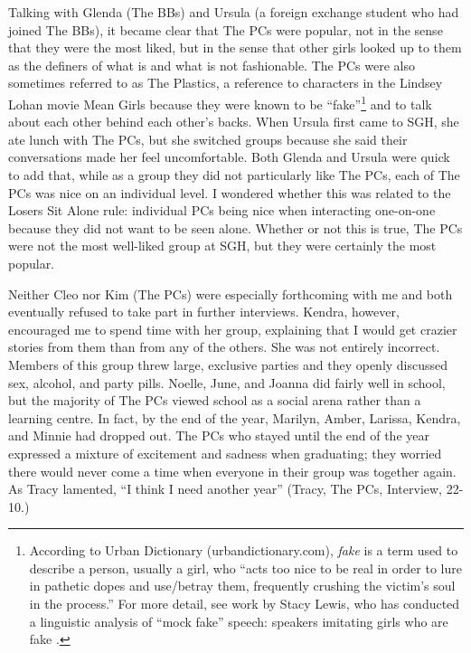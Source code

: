 Talking with Glenda (The BBs) and Ursula (a foreign exchange student who had joined The BBs), it became clear that The PCs were popular, not in the sense that they were the most liked, but in the sense that other girls looked up to them as the definers of what is and what is not fashionable. The PCs were also sometimes referred to as The Plastics, a reference to characters in the Lindsey Lohan movie Mean Girls because they were known to be ``fake''\footnote{According to Urban Dictionary (urbandictionary.com), \textit{fake} is a term used to describe a person, usually a girl, who ``acts too nice to be real in order to lure in pathetic dopes and use/betray them, frequently crushing the victim's soul in the process.''  For more detail, see work by Stacy Lewis, who has conducted a linguistic analysis of ``mock fake'' speech: speakers imitating girls who are fake \citep{lewis2007}.} and to talk about each other behind each other's backs. When Ursula first came to SGH, she ate lunch with The PCs, but she switched groups because she said their conversations made her feel uncomfortable. Both Glenda and Ursula were quick to add that, while as a group they did not particularly like The PCs, each of The PCs was nice on an individual level. I wondered whether this was related to the Losers Sit Alone rule: individual PCs being nice when interacting one-on-one because they did not want to be seen alone. Whether or not this is true, The PCs were not the most well-liked group at SGH, but they were certainly the most popular.


Neither Cleo nor Kim (The PCs) were especially forthcoming with me and both eventually refused to take part in further interviews. Kendra, however, encouraged me to spend time with her group, explaining that I would get crazier stories from them than from any of the others. She was not entirely incorrect. Members of this group threw large, exclusive parties and they openly discussed sex, alcohol, and party pills. Noelle, June, and Joanna did fairly well in school, but the majority of The PCs viewed school as a social arena rather than a learning centre. In fact, by the end of the year, Marilyn, Amber, Larissa, Kendra, and Minnie had dropped out. The PCs who stayed until the end of the year expressed a mixture of excitement and sadness when graduating; they worried there would never come a time when everyone in their group was together again. As Tracy lamented, ``I think I need another year'' (Tracy, The PCs, Interview, 22-10.)




